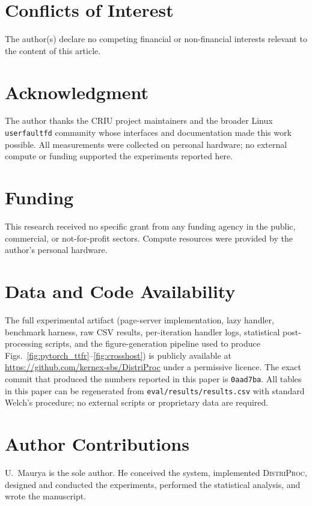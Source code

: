 \documentclass[journal]{IEEEtran}
\newcommand{\distriproc}{\textsc{DistriProc}\xspace}
\newcommand{\uffd}{\texttt{userfaultfd}\xspace}
\begin{document}
\section*{Conflicts of Interest}

The author(s) declare no competing financial or non-financial interests
relevant to the content of this article.
\else
\section*{Acknowledgment}

The author thanks the CRIU project maintainers and the broader Linux
\uffd community whose interfaces and documentation made this work
possible. All measurements were collected on personal hardware; no
external compute or funding supported the experiments reported here.

\section*{Funding}

This research received no specific grant from any funding agency in the
public, commercial, or not-for-profit sectors. Compute resources were
provided by the author's personal hardware.

\section*{Data and Code Availability}

The full experimental artifact (page-server implementation, lazy
handler, benchmark harness, raw CSV results, per-iteration handler logs,
statistical post-processing scripts, and the figure-generation pipeline
used to produce Figs.~\ref{fig:pytorch_ttfr}--\ref{fig:crosshost}) is
publicly available at
\url{https://github.com/kernex-sbs/DistriProc} under a permissive licence.
The exact commit that produced the numbers reported in this paper is
\texttt{0aad7ba}. All tables in this paper can be regenerated from
\texttt{eval/results/results.csv} with standard Welch's procedure; no
external scripts or proprietary data are required.

\section*{Author Contributions}

U.~Maurya is the sole author. He conceived the system, implemented
\distriproc, designed and conducted the experiments, performed the
statistical analysis, and wrote the manuscript.
\end{document}
